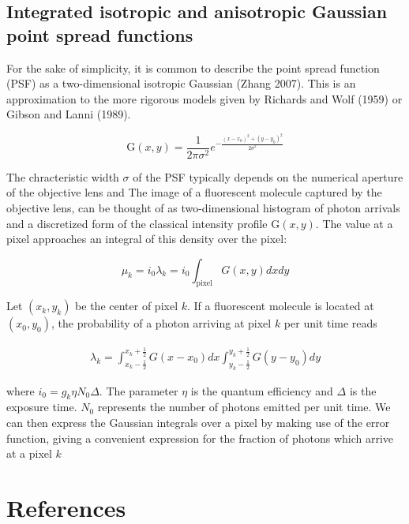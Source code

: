 \documentclass{ucetd}
\begin{document}
\subsection{Integrated isotropic and anisotropic Gaussian point spread functions}

For the sake of simplicity, it is common to describe the point spread function (PSF) as a two-dimensional isotropic Gaussian (Zhang 2007). This is an approximation to the more rigorous models given by Richards and Wolf (1959) or Gibson and Lanni (1989). 

\begin{equation*}
\mathrm{G}(x,y) = \frac{1}{2\pi\sigma^{2}}e^{-\frac{(x-x_{0})^{2}+(y-y_{0})^{2}}{2\sigma^{2}}}
\end{equation*}

The chracteristic width $\sigma$ of the PSF typically depends on the numerical aperture of the objective lens and The image of a fluorescent molecule captured by the objective lens, can be thought of as two-dimensional histogram of photon arrivals and a discretized form of the classical intensity profile $\mathrm{G}(x,y)$. The value at a pixel approaches an integral of this density over the pixel:

\begin{equation}
\mu_{k} = i_{0}\lambda_{k} = i_{0}\int_{\mathrm{pixel}} G(x,y)dxdy
\end{equation}


Let $(x_{k},y_{k})$ be the center of pixel $k$. If a fluorescent molecule is located at $(x_{0},y_{0})$, the probability of a photon arriving at pixel $k$ per unit time reads

\begin{align*}
\lambda_{k} = \int_{x_{k}-\frac{1}{2}}^{x_{k}+\frac{1}{2}}G(x-x_{0})dx \int_{y_{k}-\frac{1}{2}}^{y_{k}+\frac{1}{2}} G(y-y_{0})dy
\end{align*}

where $i_{0} = g_{k}\eta N_{0}\Delta$. The parameter $\eta$ is the quantum efficiency and $\Delta$ is the exposure time. $N_{0}$ represents the number of photons emitted per unit time. We can then express the Gaussian integrals over a pixel by making use of the error function, giving a convenient expression for the fraction of photons which arrive at a pixel $k$

\section{References}
\end{document}
